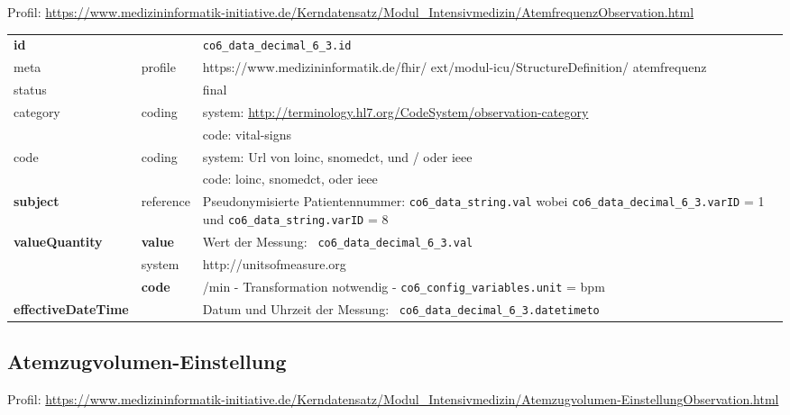 Profil: \url{https://www.medizininformatik-initiative.de/Kerndatensatz/Modul_Intensivmedizin/AtemfrequenzObservation.html}

\begin{longtable}{|l|l|p{7.5cm}|}
        \hline
        \rowcolor{lightgray} \multicolumn{3}{|l|}{Data Mapping (inhaltlich)} \\ \hline
        \textbf{id} &  & \texttt{co6\_data\_decimal\_6\_3.id} \\ \hline
	meta & profile & https://www.medizininformatik.de/fhir/ ext/modul-icu/StructureDefinition/ atemfrequenz \\ \hline 
	status &  & final   \\ \hline 
	category & coding & system: \url{http://terminology.hl7.org/CodeSystem/observation-category} \\
\cline{3-3}
	& & code: vital-signs\\ \hline
	code & coding & system: Url von \ac{loinc}, \ac{snomedct}, und / oder \ac{ieee} \\ 
	\cline{3-3} 
	 &  & code: \ac{loinc}, \ac{snomedct}, oder \ac{ieee} \\ \hline
	 \textbf{subject} & reference & Pseudonymisierte Patientennummer: \texttt{co6\_data\_string.val} wobei \texttt{co6\_data\_decimal\_6\_3.varID} = 1 und \texttt{co6\_data\_string.varID} = 8 \\ \hline
	 \textbf{valueQuantity}  & \textbf{value} & Wert der Messung: \texttt{
co6\_data\_decimal\_6\_3.val} \\
        \cline{2-3}
         & system & http://unitsofmeasure.org \\
         \cline{2-3}
         & \textbf{code} & /min - Transformation notwendig - \texttt{co6\_config\_variables.unit} = bpm 
\\ \hline
     \textbf{effectiveDateTime}  & & Datum und Uhrzeit der Messung: \texttt{
co6\_data\_decimal\_6\_3.datetimeto} \\ \hline
\end{longtable}

\subsection{Atemzugvolumen-Einstellung} 

Profil: \url{https://www.medizininformatik-initiative.de/Kerndatensatz/Modul_Intensivmedizin/Atemzugvolumen-EinstellungObservation.html}

